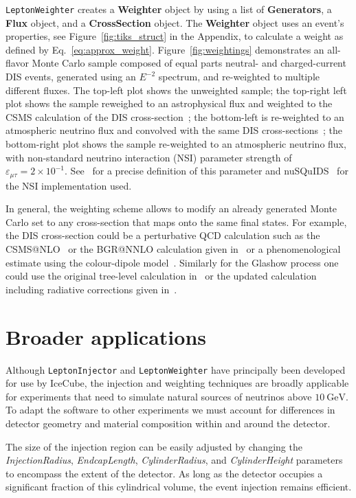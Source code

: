 \documentclass[main.tex]{subfiles}
\newcommand{\LeptonInjector}{\texttt{LeptonInjector}}
\newcommand{\LeptonWeighter}{\texttt{LeptonWeighter}}
\begin{document}
\LeptonWeighter{} creates a \textbf{Weighter} object by using a list of \textbf{Generators}, a \textbf{Flux} object, and a \textbf{CrossSection} object.
The \textbf{Weighter} object uses an event's properties, see Figure~\ref{fig:tiks_struct} in the Appendix, to calculate a weight as defined by Eq.~\eqref{eq:approx_weight}. 
Figure~\ref{fig:weightings} demonstrates an all-flavor Monte Carlo sample composed of equal parts neutral- and charged-current DIS events, generated using an $E^{-2}$ spectrum, and re-weighted to multiple different fluxes.
The top-left plot shows the unweighted sample; the top-right left plot shows the sample reweighed to an astrophysical flux and weighted to the CSMS calculation of the DIS cross-section~\cite{CooperSarkar:2011pa}; the bottom-left is re-weighted to an atmospheric neutrino flux and convolved with the same DIS cross-sections~\cite{CooperSarkar:2011pa}; the bottom-right plot shows the sample re-weighted to an atmospheric neutrino flux, with non-standard neutrino interaction (NSI) parameter strength of $\varepsilon_{\mu\tau}=2 \times 10^{-1}$.
See~\cite{Dev:2019anc} for a precise definition of this parameter and nuSQuIDS~\cite{Arguelles:2020hss,arguelles:2015nu} for the NSI implementation used.

In general, the weighting scheme allows to modify an already generated Monte Carlo set to any cross-section that maps onto the same final states. 
For example, the DIS cross-section could be a perturbative QCD calculation such as the CSMS@NLO~\cite{CooperSarkar:2011pa} or the BGR@NNLO calculation given in~\cite{Bertone:2018dse} or a phenomenological estimate using the colour-dipole model~\cite{arguelles:2015nu}. 
Similarly for the Glashow process one could use the original tree-level calculation in~\cite{Glashow:1960zz} or the updated calculation including radiative corrections given in~\cite{Gauld:2019pgt}.

\section{Broader applications}
Although \LeptonInjector{} and \LeptonWeighter{} have principally been developed for use by IceCube, the injection and weighting techniques are broadly applicable for experiments that need to simulate natural sources of neutrinos above $\SI{10}\GeV$.
To adapt the software to other experiments we must account for differences in detector geometry and material composition within and around the detector.

The size of the injection region can be easily adjusted by changing the \textit{InjectionRadius}, \textit{EndcapLength}, \textit{CylinderRadius}, and \textit{CylinderHeight} parameters to encompass the extent of the detector.
As long as the detector occupies a significant fraction of this cylindrical volume, the event injection remains efficient.
\end{document}
